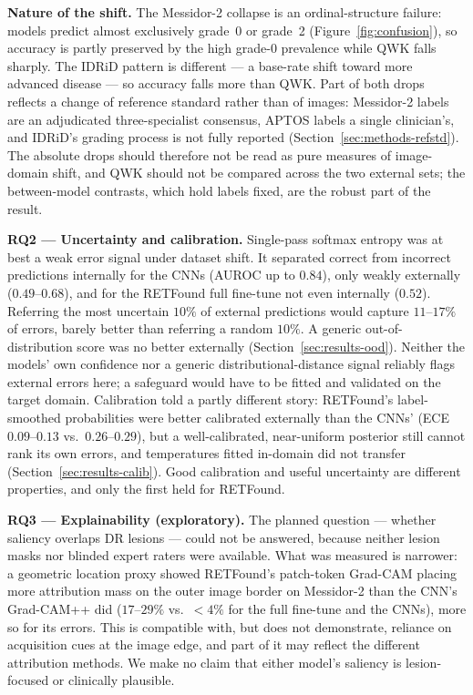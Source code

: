 \documentclass[journal]{IEEEtran}
\renewcommand{\_}{\origunderscore\allowbreak}
\begin{document}
\textbf{Nature of the shift.} The Messidor-2 collapse is an ordinal-structure
failure: models predict almost exclusively grade~0 or grade~2
(Figure~\ref{fig:confusion}), so accuracy is partly preserved by the high grade-0
prevalence while QWK falls sharply. The IDRiD pattern is different --- a base-rate
shift toward more advanced disease --- so accuracy falls more than QWK. Part of
both drops reflects a change of reference standard rather than of images:
Messidor-2 labels are an adjudicated three-specialist consensus, APTOS labels a
single clinician's, and IDRiD's grading process is not fully reported
(Section~\ref{sec:methods-refstd}). The absolute drops should therefore not be
read as pure measures of image-domain shift, and QWK should not be compared
across the two external sets; the between-model contrasts, which hold labels
fixed, are the robust part of the result.

\textbf{RQ2 --- Uncertainty and calibration.} Single-pass softmax entropy was at best a weak
error signal under dataset shift. It separated correct from incorrect predictions
internally for the CNNs (AUROC up to $0.84$), only weakly externally
($0.49$--$0.68$), and for the RETFound full fine-tune not even internally
($0.52$). Referring the most uncertain $10\%$ of external predictions would
capture $11$--$17\%$ of errors, barely better than referring a random $10\%$. A
generic out-of-distribution score was no better externally
(Section~\ref{sec:results-ood}). Neither the models' own confidence nor a generic
distributional-distance signal reliably flags external errors here; a safeguard
would have to be fitted and validated on the target domain. Calibration told a
partly different story: RETFound's label-smoothed probabilities were better
calibrated externally than the CNNs' (ECE $0.09$--$0.13$ vs.\ $0.26$--$0.29$),
but a well-calibrated, near-uniform posterior still cannot rank its own errors,
and temperatures fitted in-domain did not transfer
(Section~\ref{sec:results-calib}). Good calibration and useful uncertainty are
different properties, and only the first held for RETFound.

\textbf{RQ3 --- Explainability (exploratory).} The planned question --- whether
saliency overlaps DR lesions --- could not be answered, because neither lesion
masks nor blinded expert raters were available. What was measured is narrower: a
geometric location proxy showed RETFound's patch-token Grad-CAM placing more
attribution mass on the outer image border on Messidor-2 than the CNN's
Grad-CAM++ did ($17$--$29\%$ vs.\ $<4\%$ for the full fine-tune and the CNNs),
more so for its errors. This is compatible with, but does not demonstrate,
reliance on acquisition cues at the image edge, and part of it may reflect the
different attribution methods. We make no claim that either model's saliency is
lesion-focused or clinically plausible.
\end{document}
